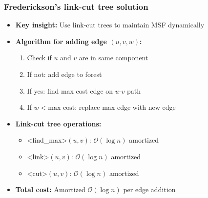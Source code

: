 \documentclass[fleqn]{beamer}
\newcommand{\Oh}{\mathcal{O}}
\def\texttt#1{<#1>}%
\begin{document}
\begin{frame}
    \frametitle{Frederickson's link-cut tree solution}
    
    \begin{itemize}
    \item \textbf{Key insight:} Use link-cut trees to maintain MSF dynamically \vfill\pause
    \item \textbf{Algorithm for adding edge $(u,v,w)$:}
        \begin{enumerate}
        \item Check if $u$ and $v$ are in same component
        \item If not: add edge to forest
        \item If yes: find max cost edge on $u$-$v$ path
        \item If $w < \text{max cost}$: replace max edge with new edge
        \end{enumerate} \vfill\pause
    \item \textbf{Link-cut tree operations:}
        \begin{itemize}
        \item \texttt{find\_max}$(u,v)$: $\Oh(\log n)$ amortized
        \item \texttt{link}$(u,v)$: $\Oh(\log n)$ amortized
        \item \texttt{cut}$(u,v)$: $\Oh(\log n)$ amortized
        \end{itemize} \vfill\pause
    \item \textbf{Total cost:} Amortized $\Oh(\log n)$ per edge addition \vfill
    \end{itemize}
\end{frame}
\end{document}
